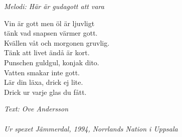 {\footnotesize\textit{Melodi: Här är gudagott att vara}}\par
\vspace{10pt}
Vin är gott men öl är ljuvligt\\
tänk vad snapsen värmer gott.\\
Kvällen våt och morgonen gruvlig.\\
Tänk att livet ändå är kort.\\
Punschen guldgul, konjak dito.\\
Vatten smakar inte gott.\\
Lär din läxa, drick ej lite.\\
Drick ur varje glas du fått.\par
\vspace{10pt}
{\footnotesize\textit{Text: Ove Andersson\\ \\ Ur spexet Jämmerdal,
    1994, Norrlands Nation i Uppsala}}
